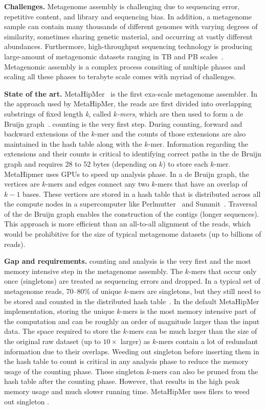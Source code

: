 \noindent
{\bf Challenges.}
Metagenome assembly is challenging due to sequencing error, repetitive content, and library and sequencing bias. In addition, a metagenome sample can contain many thousands of different genomes with varying degrees of similarity, sometimes sharing genetic material, and occurring at vastly different abundances.
%
Furthermore, high-throughput sequencing technology is producing large-amount of metagenomic datasets ranging in TB and PB scales~\cite{hofmeyr2020terabase}. Metagenomic assembly is a complex process consiting of multiple phases and scaling all these phases to terabyte scale comes with myriad of challenges.

\noindent
{\bf State of the art.}
MetaHipMer~\cite{GeorganasEHG18,HofmeyrEGC20} is the first exa-scale metagenome assembler.
In the approach used by MetaHipMer, the reads are first divided into overlapping substrings of fixed length {\it k}, called {\it $k$-mers}, which are then used to form a de Bruijn graph~\cite{CompeauPeTe11}. 
\Kmer counting is the very first step. During \kmer counting, forward and backward extensions of the $k$-mer and the counts of those extensions are also maintained in the hash table along with the $k$-mer. Information regarding the extensions and their counts is critical to identifying correct paths in the de Bruijn graph and requires 28 to 52 bytes (depending on $k$) to store each $k$-mer.
MetaHipmer uses GPUs to speed up \kmer analysis phase.
In a de Bruijn graph, the vertices are $k$-mers and edges connect any two $k$-mers that have an overlap of $k-1$ bases. These vertices are stored in a hash table that is distributed across all the compute nodes in a supercomputer like Perlmutter~\cite{perlmutter} and Summit~\cite{summit}. 
Traversal of the de Bruijn graph enables the construction of the contigs (longer sequences).  This approach is more efficient than an all-to-all alignment of the reads, which would be prohibitive for the size of typical metagenome datasets (up to billions of reads).

\noindent
{\bf Gap and requirements.}
\Kmer counting and analysis is the very first and the most memory intensive step in the metagenome assembly. The $k$-mers that occur only once (singletons) are treated as sequencing errors and dropped. In a typical set of metagenome reads, 70--80\% of unique $k$-mers are singletons, but they still need to be stored and counted in the distributed hash table~. 
In the default MetaHipMer implementation, storing the unique $k$-mers is the most memory intensive part of the computation and can be roughly an order of magnitude larger than the input data.  The space required to store the $k$-mers can be much larger than the size of the original raw dataset (up to $10\times$ larger) as $k$-mers contain a lot of redundant information due to their overlaps.
Weeding out singleton \kmers before inserting them in the hash table to count is critical in any \kmer analysis phase to reduce the memory usage of the counting phase. These singleton $k$-mers can also be pruned from the hash table after the counting phase. However, that results in the high peak memory usage and much slower running time. MetaHipMer uses filers to weed out singleton \kmers.

